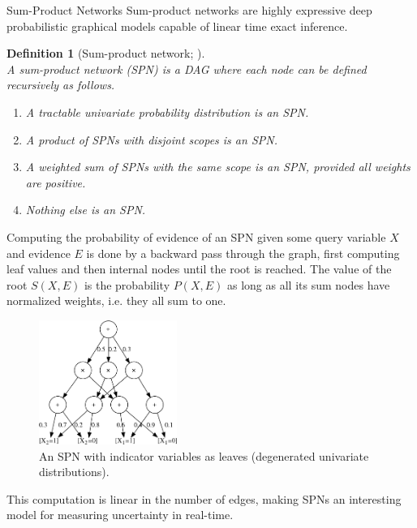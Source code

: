 \documentclass[final,hyperref={pdfpagelabels=false},notheorems]{beamer}
\theoremstyle{thesisstyle}
\newtheorem{definition}{Definition}
\begin{document}
\begin{frame}[t]
\begin{columns}[t]
\begin{column}{.5\textwidth}
    \begin{block}{Sum-Product Networks}
      Sum-product networks are highly expressive deep probabilistic graphical models capable of
      linear time exact inference.
      \begin{definition}[Sum-product network; \cite{gens-domingos}]~\\
        A sum-product network (SPN) is a DAG where each node can be defined recursively as follows.
        \begin{enumerate}
          \item A tractable univariate probability distribution is an SPN\@.
          \item A product of SPNs with disjoint scopes is an SPN\@.
          \item A weighted sum of SPNs with the same scope is an SPN, provided all weights are positive.
          \item Nothing else is an SPN\@.
        \end{enumerate}
      \end{definition}
      Computing the probability of evidence of an SPN given some query variable $X$ and evidence
      $E$ is done by a backward pass through the graph, first computing leaf values and then
      internal nodes until the root is reached. The value of the root $S(X,E)$ is the probability
      $P(X,E)$ as long as all its sum nodes have normalized weights, i.e. they all sum to one.
      \begin{figure}[h]
        \centering\includegraphics[width=0.4\textwidth]{imgs/sample_spn.png}
        \caption{An SPN with indicator variables as leaves (degenerated univariate distributions).}
      \end{figure}
      This computation is linear in the number of edges, making SPNs an interesting model for
      measuring uncertainty in real-time.
    \end{block}


\end{column}
\end{columns}
\end{frame}
\end{document}
